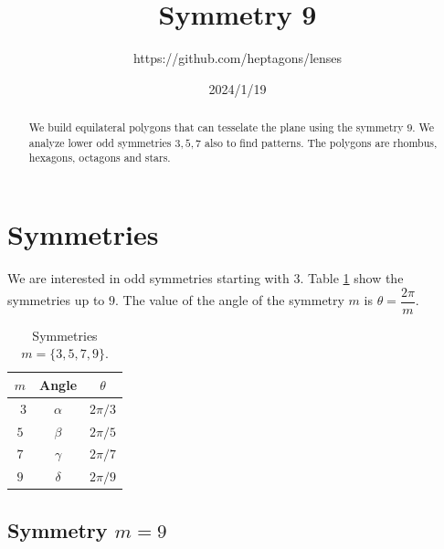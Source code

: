 \documentclass[11pt]{article}
\title{Symmetry 9}
\author{https://github.com/heptagons/lenses}
\date{2024/1/19}
\begin{document}
\maketitle
\begin{abstract}
We build equilateral polygons that can tesselate the plane using the symmetry $9$. We analyze lower odd symmetries $3,5,7$ also to find patterns. The polygons are rhombus, hexagons, octagons and stars.
\end{abstract}

\section{Symmetries}

We are interested in odd symmetries starting with $3$. Table \ref{tbl:symm} show the symmetries up to $9$. The value of the angle of the symmetry $m$ is $\theta = \dfrac{2\pi}m$. 

\begin{table}[H]
\begin{center}
\begin{tabular}{|c|c c|}
\hline
$m$ & Angle & $\theta$ \\ \hline\
$3$ & $\alpha$ & $2\pi/3$ \\ \hline
$5$ & $\beta$  & $2\pi/5$ \\ \hline
$7$ & $\gamma$ & $2\pi/7$ \\ \hline
$9$ & $\delta$ & $2\pi/9$ \\ \hline
\end{tabular}
\caption{Symmetries $m=\{3,5,7,9\}$.} 
\label{tbl:symm}
\end{center}
\end{table}

\subsection{Symmetry $m=9$}
\end{document}

